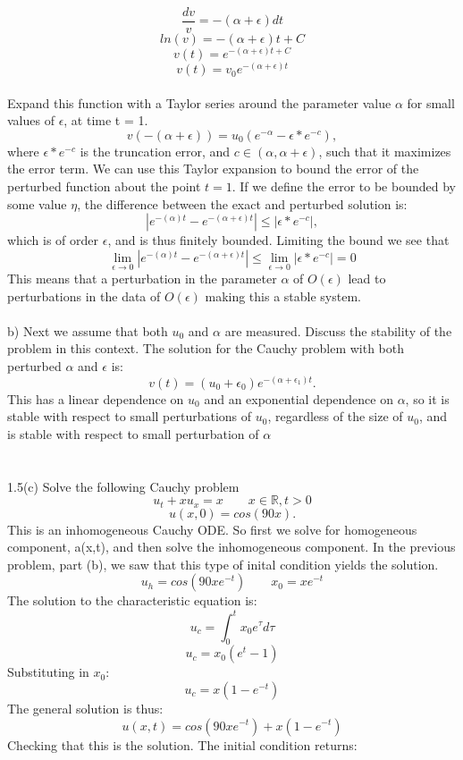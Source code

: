 \documentclass{article}
\begin{document}
\[ \frac{dv}{v} = -(\alpha + \epsilon)dt\]
\[ ln(v) = -(\alpha + \epsilon)t+C \]
\[v(t)=e^{-(\alpha +\epsilon)t+C} \]
\[v(t) = v_{0}e^{-(\alpha+\epsilon)t}\]\\
Expand this function with a Taylor series around the parameter value \(\alpha\) for small values of \(\epsilon\), at time t = 1.
\[v(-(\alpha+\epsilon)) = u_{0}( e^{-\alpha} - \epsilon*e^{-c} ), \]
where \(\epsilon*e^{-c}\) is the truncation error, and \(c \in(\alpha,\alpha+\epsilon)\), such that it maximizes the error term.
We can use this Taylor expansion to bound the error of the perturbed function 
about the point \(t=1\). If we define the error to be bounded by some value \(\eta\), the difference between the exact and perturbed solution is:
\[|  e^{-(\alpha )t}-e^{-(\alpha + \epsilon)t}| \le |\epsilon*e^{-c}|, \]
which is of order \(\epsilon\), and is thus finitely bounded.
 Limiting the bound we see that 
\[\lim_{\epsilon \to 0}|  e^{-(\alpha )t}-e^{-(\alpha + \epsilon)t}| \le \lim_{\epsilon \to 0}|\epsilon*e^{-c}| =0\] 
This means that a perturbation in the parameter $\alpha$ of \( O(\epsilon)\) lead to perturbations in the data of $O(\epsilon)$ making this a stable system.\\
\\
b) Next we assume that both \(u_{0}\) and $\alpha$ are measured. Discuss the stability of the problem in this context.
The solution for the Cauchy problem with both perturbed $\alpha$ and $\epsilon$  is:
\[v(t) = (u_{0}+\epsilon_{0})e^{-(\alpha+\epsilon_{1})t}. \]
This has a linear dependence on $u_{0}$ and an exponential dependence on $\alpha$, so it is stable with respect to small perturbations of $u_{0}$, regardless of the size of $u_{0}$, and is stable with respect to small perturbation of $\alpha$\\
\\
\\
1.5(c) Solve the following Cauchy problem\\
 \[u_{t} + xu_{x} = x\qquad {x \in \mathbb{R}, t>0}\]
\[u(x,0) = cos(90x).\]
This is an inhomogeneous Cauchy ODE. So first we solve for homogeneous component, a(x,t), and then solve the inhomogeneous component. In the previous problem, part (b), we saw that this type of inital condition yields the solution.
\[u_{h} =cos(90xe^{-t})\qquad x_{0} = xe^{-t} \]
The solution to the characteristic equation is:
\[u_{c} = \int_{0}^t x_{0}e^{\tau}d\tau\]
\[ u_{c} = x_{0}(e^t-1)\]
Substituting in $x_{0}$:
\[u_{c} = x(1 -e^{-t})\]
The general solution is thus:
\[u(x,t)=cos(90xe^{-t}) +x(1-e^{-t})\]
Checking that this is the solution. The initial condition returns:\\
\end{document}
